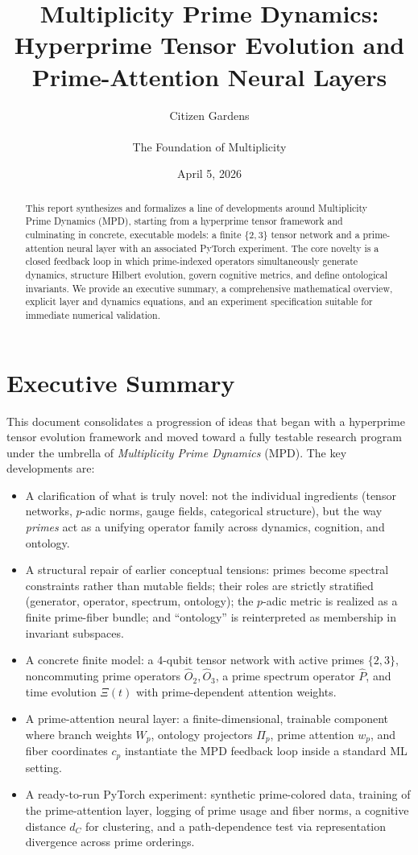 \documentclass[11pt]{article}
\title{Multiplicity Prime Dynamics:\\
Hyperprime Tensor Evolution and Prime-Attention Neural Layers}
\author{Citizen Gardens \\ \\ The Foundation of Multiplicity}
\date{April 5, 2026}
\begin{document}
\maketitle

\begin{abstract}
This report synthesizes and formalizes a line of developments around Multiplicity Prime Dynamics (MPD), starting from a hyperprime tensor framework and culminating in concrete, executable models: a finite $\{2,3\}$ tensor network and a prime-attention neural layer with an associated PyTorch experiment. The core novelty is a closed feedback loop in which prime-indexed operators simultaneously generate dynamics, structure Hilbert evolution, govern cognitive metrics, and define ontological invariants. We provide an executive summary, a comprehensive mathematical overview, explicit layer and dynamics equations, and an experiment specification suitable for immediate numerical validation.
\end{abstract}

\tableofcontents

\section{Executive Summary}

This document consolidates a progression of ideas that began with a hyperprime tensor evolution framework and moved toward a fully testable research program under the umbrella of \emph{Multiplicity Prime Dynamics} (MPD). The key developments are:

\begin{itemize}[nosep]
  \item A clarification of what is truly novel: not the individual ingredients (tensor networks, $p$-adic norms, gauge fields, categorical structure), but the way \emph{primes} act as a unifying operator family across dynamics, cognition, and ontology.
  \item A structural repair of earlier conceptual tensions: primes become spectral constraints rather than mutable fields; their roles are strictly stratified (generator, operator, spectrum, ontology); the $p$-adic metric is realized as a finite prime-fiber bundle; and ``ontology'' is reinterpreted as membership in invariant subspaces.
  \item A concrete finite model: a 4-qubit tensor network with active primes $\{2,3\}$, noncommuting prime operators $\hat{O}_2,\hat{O}_3$, a prime spectrum operator $\hat{P}$, and time evolution $\Xi(t)$ with prime-dependent attention weights.
  \item A prime-attention neural layer: a finite-dimensional, trainable component where branch weights $W_p$, ontology projectors $\Pi_p$, prime attention $w_p$, and fiber coordinates $c_p$ instantiate the MPD feedback loop inside a standard ML setting.
  \item A ready-to-run PyTorch experiment: synthetic prime-colored data, training of the prime-attention layer, logging of prime usage and fiber norms, a cognitive distance $d_C$ for clustering, and a path-dependence test via representation divergence across prime orderings.
\end{itemize}
\end{document}

